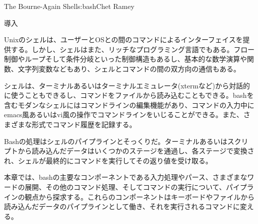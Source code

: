 \begin{aosachapter}{The Bourne-Again Shell}{s:bash}{Chet Ramey}

\begin{aosasect1}{導入}

Unixのシェルは、ユーザーとOSとの間のコマンドによるインターフェイスを提供する。しかし、シェルはまた、リッチなプログラミング言語でもある。フロー制御やループそして条件分岐といった制御構造もあるし、基本的な数学演算や関数、文字列変数などもあり、シェルとコマンドの間の双方向の通信もある。

シェルは、ターミナルあるいはターミナルエミュレータ(xtermなど)から対話的に使うこともできるし、コマンドをファイルから読み込むこともできる。bashを含むモダンなシェルにはコマンドラインの編集機能があり、コマンドの入力中にemacs風あるいはvi風の操作でコマンドラインをいじることができる。また、さまざまな形式でコマンド履歴を記録する。

Bashの処理はシェルのパイプラインとそっくりだ。ターミナルあるいはスクリプトから読み込んだデータはいくつかのステージを通過し、各ステージで変換され、シェルが最終的にコマンドを実行してその返り値を受け取る。

本章では、bashの主要なコンポーネントである入力処理やパース、さまざまなワードの展開、その他のコマンド処理、そしてコマンドの実行について、パイプラインの観点から探求する。これらのコンポーネントはキーボードやファイルから読み込んだデータのパイプラインとして働き、それを実行されるコマンドに変える。


\end{aosasect1}
\end{aosachapter}
